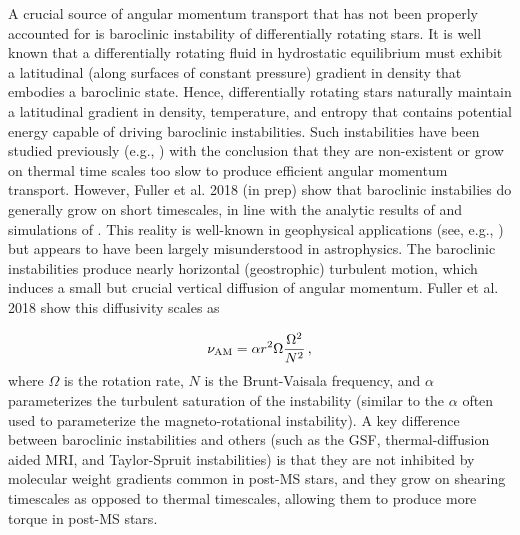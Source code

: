 {A crucial source of angular momentum transport that has not been properly accounted for is baroclinic instability of differentially rotating stars. It is well known that a differentially rotating fluid in hydrostatic equilibrium must exhibit a latitudinal (along surfaces of constant pressure) gradient in density that embodies a baroclinic state. Hence, differentially rotating stars naturally maintain a latitudinal gradient in density, temperature, and entropy that contains potential energy capable of driving baroclinic instabilities. Such instabilities have been studied previously (e.g., \citealt{goldreich:67,knobloch:82,knobloch:83,spruit:84,zahn:93}) with the conclusion that they are non-existent or grow on thermal time scales too slow to produce efficient angular momentum transport. However, Fuller et al. 2018 (in prep) show that baroclinic instabilies do generally grow on short timescales, in line with the analytic results of \citep{tassoul:82,fujimoto:87,fujimoto:88} and simulations of \cite{simitev:17}. This reality is well-known in geophysical applications (see, e.g., \citealt{pedlosky:92}) but appears to have been largely misunderstood in astrophysics. The baroclinic instabilities produce nearly horizontal (geostrophic) turbulent motion, which induces a small but crucial vertical diffusion of angular momentum. Fuller et al. 2018 show this diffusivity scales as

\begin{equation}
\label{numri} 
\nu_{\rm AM} = \alpha r^2 \Omega \frac{\Omega^2}{N^2} \, ,

\end{equation}
where $\Omega$ is the rotation rate, $N$ is the Brunt-Vaisala frequency, and $\alpha$ parameterizes the turbulent saturation of the instability (similar to the $\alpha$ often used to parameterize the magneto-rotational instability). A key difference between baroclinic instabilities and others (such as the GSF, thermal-diffusion aided MRI, and Taylor-Spruit instabilities) is that they are not inhibited by molecular weight gradients common in post-MS stars, and they grow on shearing timescales as opposed to thermal timescales, allowing them to produce more torque in post-MS stars.


}